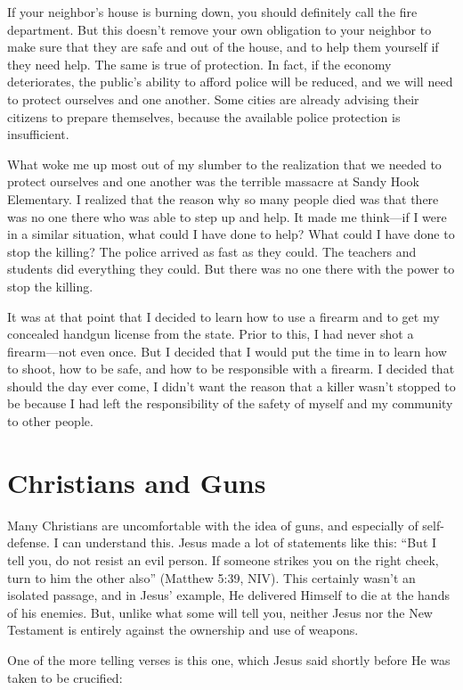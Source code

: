 If your neighbor’s house is burning down, you should definitely call the
fire department. But this doesn’t remove your own obligation to your
neighbor to make sure that they are safe and out of the house, and to
help them yourself if they need help. The same is true of protection.
In fact, if the economy deteriorates, the public’s ability to afford
police will be reduced, and we will need to protect ourselves and one
another. Some cities are already advising their citizens to prepare
themselves, because the available police protection is insufficient. 

What woke me up most out of my slumber to the realization that we needed
to protect ourselves and one another was the terrible massacre at Sandy
Hook Elementary. I realized that the reason why so many people died was
that there was no one there who was able to step up and help. It made
me think—if I were in a similar situation, what could I have done to
help?  What could I have done to stop the killing?  The police arrived
as fast as they could. The teachers and students did everything they
could. But there was no one there with the power to stop the killing.

It was at that point that I decided to learn how to use a firearm and to
get my concealed handgun license from the state. Prior to this, I had
never shot a firearm—not even once. But I decided that I would put the
time in to learn how to shoot, how to be safe, and how to be
responsible with a firearm. I decided that should the day ever come, I
didn’t want the reason that a killer wasn’t stopped to be because I had
left the responsibility of the safety of myself and my community to
other people.

\section{Christians and Guns}

Many Christians are uncomfortable with the idea of guns, and especially
of self-defense. I can understand this. Jesus made a lot of statements
like this: “But I tell you, do not resist an evil person. If someone
strikes you on the right cheek, turn to him the other also” (Matthew
5:39, NIV). This certainly wasn’t an isolated passage, and in Jesus’
example, He delivered Himself to die at the hands of his enemies. But,
unlike what some will tell you, neither Jesus nor the New Testament is
entirely against the ownership and use of weapons.

One of the more telling verses is this one, which Jesus said shortly
before He was taken to be crucified:

